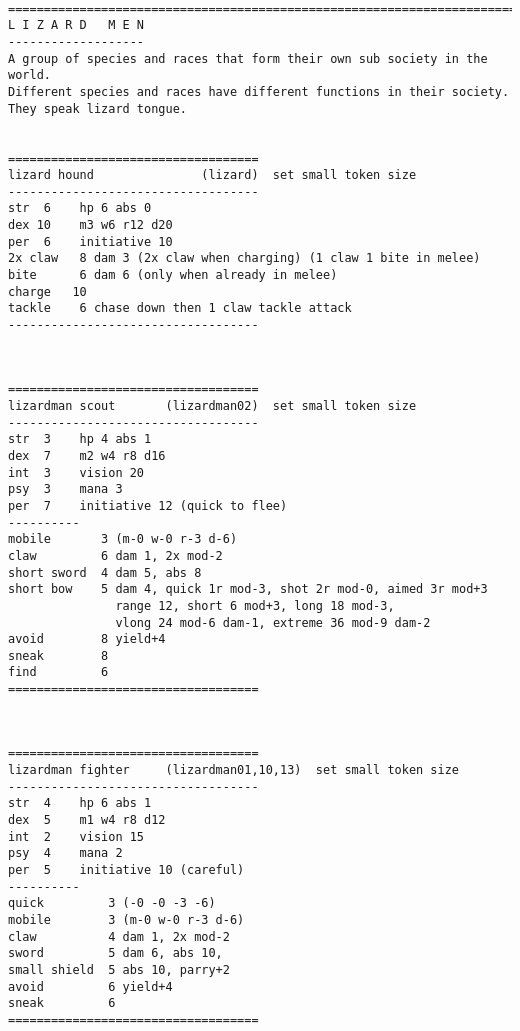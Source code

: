 \







\goodbreak
 {}

\goodbreak \begin{samepage} \small \begin{verbatim}
================================================================================
L I Z A R D   M E N
-------------------
A group of species and races that form their own sub society in the world.
Different species and races have different functions in their society.
They speak lizard tongue.


===================================
lizard hound               (lizard)  set small token size
-----------------------------------
str  6    hp 6 abs 0
dex 10    m3 w6 r12 d20
per  6    initiative 10
2x claw   8 dam 3 (2x claw when charging) (1 claw 1 bite in melee)
bite      6 dam 6 (only when already in melee)
charge   10
tackle    6 chase down then 1 claw tackle attack
-----------------------------------
\end{verbatim} \normalsize \end{samepage}

\

\goodbreak \begin{samepage} \small \begin{verbatim}
===================================
lizardman scout       (lizardman02)  set small token size
-----------------------------------
str  3    hp 4 abs 1
dex  7    m2 w4 r8 d16
int  3    vision 20
psy  3    mana 3
per  7    initiative 12 (quick to flee)
----------
mobile       3 (m-0 w-0 r-3 d-6)
claw         6 dam 1, 2x mod-2
short sword  4 dam 5, abs 8
short bow    5 dam 4, quick 1r mod-3, shot 2r mod-0, aimed 3r mod+3
               range 12, short 6 mod+3, long 18 mod-3,
               vlong 24 mod-6 dam-1, extreme 36 mod-9 dam-2
avoid        8 yield+4
sneak        8
find         6
===================================
\end{verbatim} \normalsize \end{samepage}

\

\goodbreak \begin{samepage} \small \begin{verbatim}
===================================
lizardman fighter     (lizardman01,10,13)  set small token size
-----------------------------------
str  4    hp 6 abs 1
dex  5    m1 w4 r8 d12
int  2    vision 15
psy  4    mana 2
per  5    initiative 10 (careful)
----------
quick         3 (-0 -0 -3 -6)
mobile        3 (m-0 w-0 r-3 d-6)
claw          4 dam 1, 2x mod-2
sword         5 dam 6, abs 10,
small shield  5 abs 10, parry+2
avoid         6 yield+4
sneak         6
===================================
\end{verbatim} \normalsize \end{samepage}


